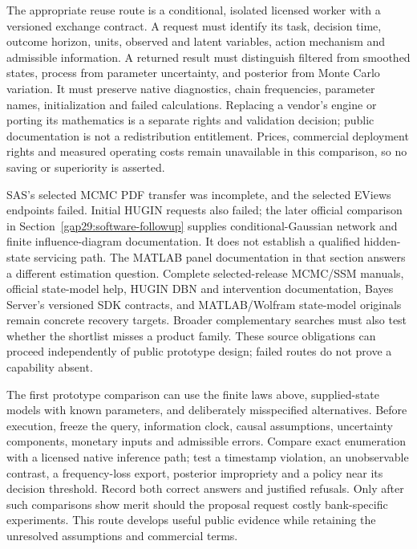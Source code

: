The appropriate reuse route is a conditional, isolated licensed worker with a
versioned exchange contract. A request must identify its task, decision time,
outcome horizon, units, observed and latent variables, action mechanism and
admissible information. A returned result must distinguish filtered from
smoothed states, process from parameter uncertainty, and posterior from Monte
Carlo variation. It must preserve native diagnostics, chain frequencies,
parameter names, initialization and failed calculations. Replacing a vendor's
engine or porting its mathematics is a separate rights and validation decision;
public documentation is not a redistribution entitlement. Prices, commercial
deployment rights and measured operating costs remain unavailable in this
comparison, so no saving or superiority is asserted.

SAS's selected MCMC PDF transfer was incomplete, and the selected EViews
endpoints failed. Initial HUGIN requests also failed; the later official
comparison in Section~\ref{gap29:software-followup} supplies conditional-Gaussian
network and finite influence-diagram documentation. It does not establish a
qualified hidden-state servicing path. The MATLAB panel documentation in that
section answers a different estimation question. \citep{gap29hugin,gap29matlab}
Complete selected-release MCMC/SSM manuals, official state-model help, HUGIN
DBN and intervention documentation, Bayes Server's versioned SDK contracts,
and MATLAB/Wolfram state-model originals remain concrete recovery targets.
Broader complementary searches must also test whether the shortlist misses
a product family. These source obligations can proceed independently of
public prototype design; failed routes do not prove a capability absent.

The first prototype comparison can use the finite laws above, supplied-state
models with known parameters, and deliberately misspecified alternatives.
Before execution, freeze the query, information clock, causal assumptions,
uncertainty components, monetary inputs and admissible errors. Compare exact
enumeration with a licensed native inference path; test a timestamp violation,
an unobservable contrast, a frequency-loss export, posterior impropriety and a
policy near its decision threshold. Record both correct answers and justified
refusals. Only after such comparisons show merit should the proposal request
costly bank-specific experiments. This route develops useful public evidence
while retaining the unresolved assumptions and commercial terms.



